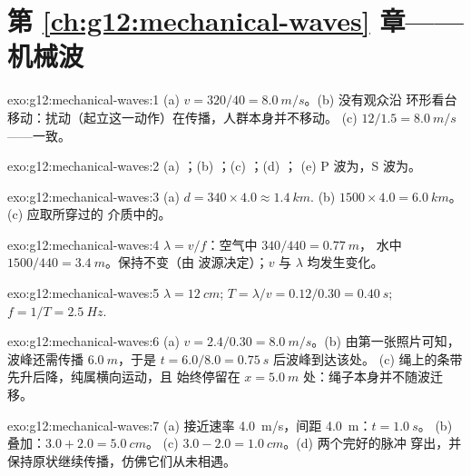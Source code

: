 \section*{第 \ref{ch:g12:mechanical-waves} 章——机械波}

\begin{solution}{exo:g12:mechanical-waves:1}
(a) $v = 320/40 = \qty{8.0}{m/s}$。(b) 没有观众沿
环形看台移动：扰动（起立这一动作）在传播，人群本身并不移动。
(c) $12/1.5 = \qty{8.0}{m/s}$——一致。
\end{solution}

\begin{solution}{exo:g12:mechanical-waves:2}
(a) ；(b) ；(c) ；(d) ；
(e) P 波为，S 波为。
\end{solution}

\begin{solution}{exo:g12:mechanical-waves:3}
(a) $d = 340 \times 4.0 \approx \qty{1.4}{km}$.
(b) $1500 \times 4.0 = \qty{6.0}{km}$。(c) 应取所穿过的
介质中的。
\end{solution}

\begin{solution}{exo:g12:mechanical-waves:4}
$\lambda = v/f$：空气中 $340/440 = \qty{0.77}{m}$，
水中 $1500/440 = \qty{3.4}{m}$。保持不变（由
波源决定）；$v$ 与 $\lambda$ 均发生变化。
\end{solution}

\begin{solution}{exo:g12:mechanical-waves:5}
$\lambda = \qty{12}{cm}$; $T = \lambda/v = 0.12/0.30 = \qty{0.40}{s}$;
$f = 1/T = \qty{2.5}{Hz}$.
\end{solution}

\begin{solution}{exo:g12:mechanical-waves:6}
(a) $v = 2.4/0.30 = \qty{8.0}{m/s}$。(b) 由第一张照片可知，
波峰还需传播 $\qty{6.0}{m}$，于是 $t = 6.0/8.0 = \qty{0.75}{s}$ 后波峰到达该处。
(c) 绳上的条带先升后降，纯属横向运动，且
始终停留在 $x = \qty{5.0}{m}$ 处：绳子本身并不随波迁移。
\end{solution}

\begin{solution}{exo:g12:mechanical-waves:7}
(a) 接近速率 \qty{4.0}{m/s}，间距 \qty{4.0}{m}：$t = \qty{1.0}{s}$。
(b) 叠加：$3.0 + 2.0 = \qty{5.0}{cm}$。
(c) $3.0 - 2.0 = \qty{1.0}{cm}$。(d) 两个完好的脉冲
穿出，并保持原状继续传播，仿佛它们从未相遇。
\end{solution}

